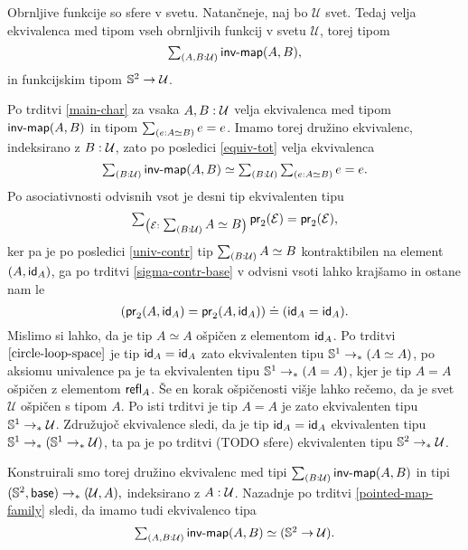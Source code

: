 \begin{izrek}
  Obrnljive funkcije so sfere v svetu. Natančneje, naj bo \(\mathcal{U}\) svet. Tedaj velja ekvivalenca med tipom vseh obrnljivih funkcij v svetu \(\mathcal{U}\), torej tipom \[{\textstyle \sum_{\left( A, B : \mathcal{U} \right)} \textnormal{\textsf{inv-map}}(A, B)},\] in funkcijskim tipom \(\mathbb{S}^{2} \to \mathcal{U}\).
\end{izrek}

\begin{dokaz}
  Po trditvi \ref{main-char} za vsaka \(A, B : \mathcal{U}\) velja ekvivalenca med tipom \(\textnormal{\textsf{inv-map}}(A, B)\) in tipom \(\textstyle \sum_{\left( e : A \simeq B \right)} e = e\). Imamo torej družino ekvivalenc, indeksirano z \(B : \mathcal{U}\), zato po posledici \ref{equiv-tot} velja ekvivalenca
  \[\textstyle \sum_{\left( B : \mathcal{U} \right)} \textnormal{\textsf{inv-map}}(A, B) \simeq \textstyle \sum_{\left( B : \mathcal{U} \right)} \textstyle \sum_{\left( e : A \simeq B \right)} e = e.\]
  Po asociativnosti odvisnih vsot je desni tip ekvivalenten tipu
  \[\textstyle \sum_{\left( \mathcal{E} : \textstyle \sum_{\left( B : \mathcal{U} \right)} A \simeq B \right)} \textnormal{\textsf{pr}}_{2}(\mathcal{E}) = \textnormal{\textsf{pr}}_{2}(\mathcal{E}),\]
  ker pa je po posledici \ref{univ-contr} tip \(\textstyle \sum_{\left( B : \mathcal{U} \right)} A \simeq B\) kontraktibilen na element \((A, \textnormal{\textsf{id}}_{A})\), ga po trditvi \ref{sigma-contr-base} v odvisni vsoti lahko krajšamo in ostane nam le
  \[(\textnormal{\textsf{pr}}_{2}(A, \textnormal{\textsf{id}}_{A}) = \textnormal{\textsf{pr}}_{2}(A, \textnormal{\textsf{id}}_{A})) \doteq (\textnormal{\textsf{id}}_{A} = \textnormal{\textsf{id}}_{A}).\]
  Mislimo si lahko, da je tip \(A \simeq A\) ošpičen z elementom \(\textnormal{\textsf{id}}_{A}\).
  Po trditvi \(\ref{circle-loop-space}\) je tip \(\textnormal{\textsf{id}}_{A} = \textnormal{\textsf{id}}_{A}\) zato ekvivalenten tipu \(\mathbb{S}^{1} \to_{\ast} (A \simeq A)\), po aksiomu univalence pa je ta ekvivalenten tipu
  \(\mathbb{S}^{1} \to_{\ast} (A = A)\), kjer je tip \(A = A\) ošpičen z elementom \(\textnormal{\textsf{refl}}_{A}\).
  Še en korak ošpičenosti višje lahko rečemo, da je svet \(\mathcal{U}\) ošpičen s tipom \(A\).
  Po isti trditvi je tip \(A = A\) je zato ekvivalenten tipu \(\mathbb{S}^{1} \to_{\ast} \mathcal{U}\).
  Združujoč ekvivalence sledi, da je tip \(\textnormal{\textsf{id}}_{A} = \textnormal{\textsf{id}}_{A}\) ekvivalenten tipu
  \(\mathbb{S}^{1} \to_{\ast} (\mathbb{S}^{1} \to_{\ast} \mathcal{U})\), ta pa je po trditvi (TODO sfere) ekvivalenten tipu \(\mathbb{S}^{2} \to_{\ast} \mathcal{U}\).

  Konstruirali smo torej družino ekvivalenc med tipi \(\textstyle \sum_{\left( B : \mathcal{U} \right)} \textnormal{\textsf{inv-map}}(A, B)\) in tipi \((\mathbb{S}^{2}, \textnormal{\textsf{base}}) \to_{\ast} (\mathcal{U}, A),\) indeksirano z \(A : \mathcal{U}\).
  Nazadnje po trditvi \ref{pointed-map-family} sledi, da imamo tudi ekvivalenco tipa
  \[\textstyle \sum_{\left( A, B : \mathcal{U} \right)} \textnormal{\textsf{inv-map}}(A, B) \simeq (\mathbb{S}^{2} \to \mathcal{U}).\]
\end{dokaz}

